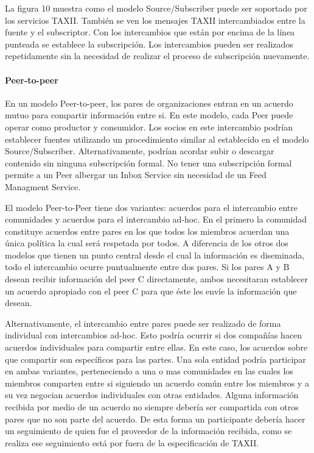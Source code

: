 La figura 10 muestra como el modelo Source/Subscriber puede ser soportado por los 
servicios TAXII. También se ven los mensajes TAXII intercambiados entre la
fuente y el subscriptor. Con los intercambios que están por encima de la línea 
punteada se establece la subscripción. Los intercambios pueden ser realizados 
repetidamente sin la necesidad de realizar el proceso de subscripción 
nuevamente.

\newpage

\paragraph{Peer-to-peer} 

En un modelo Peer-to-peer, los pares de organizaciones entran en un acuerdo 
mutuo para compartir información entre si. En este modelo, cada Peer puede 
operar como productor y consumidor. Los socios en este intercambio podrían 
establecer fuentes utilizando un procedimiento similar al establecido en el 
modelo Source/Subscriber. Alternativamente, podrían acordar subir o descargar 
contenido sin ninguna subscripción formal. No tener una subscripción formal 
permite a un Peer albergar un Inbox Service sin necesidad de un Feed 
Managment Service.

El modelo Peer-to-Peer tiene dos variantes: acuerdos para el intercambio entre 
comunidades y acuerdos para el intercambio ad-hoc. En el primero la comunidad 
constituye acuerdos entre pares en los que todos los miembros acuerdan una única 
política la cual será respetada por todos. A diferencia de los otros dos 
modelos que tienen un punto central desde el cual la información es diseminada, 
todo el intercambio ocurre puntualmente entre dos pares. Si los pares A y B 
desean recibir información del peer C directamente, ambos necesitaran 
establecer un acuerdo apropiado con el peer C para que éste les envíe la 
información que desean.

Alternativamente, el intercambio entre pares puede ser realizado de forma 
individual con intercambios ad-hoc. Esto podría ocurrir si dos compañías hacen 
acuerdos individuales para compartir entre ellas. En este caso, los acuerdos 
sobre que compartir son específicos para las partes. Una sola entidad podría 
participar en ambas variantes, perteneciendo a una o mas comunidades en las 
cuales los miembros comparten entre si siguiendo un acuerdo común entre los 
miembros y a su vez negocian acuerdos individuales con otras entidades. Alguna 
información recibida por medio de un acuerdo no siempre debería ser compartida 
con otros pares que no son parte del acuerdo. De esta forma un participante 
debería hacer un seguimiento de quien fue el proveedor de la información 
recibida, como se realiza ese seguimiento está por fuera de la especificación de 
TAXII.


